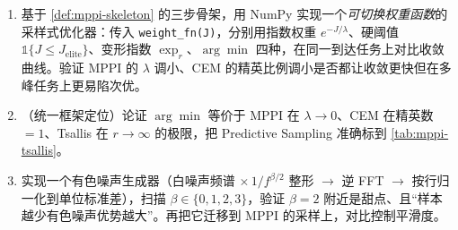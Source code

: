 \begin{practice}
\begin{enumerate}
  \item 基于 \cref{def:mppi-skeleton} 的三步骨架，用 NumPy 实现一个\emph{可切换权重函数}的采样式优化器：传入 \texttt{weight\_fn(J)}，分别用指数权重 $e^{-J/\lambda}$、硬阈值 $\mathbb{1}\{J\le J_{\mathrm{elite}}\}$、变形指数 $\exp_r$、$\arg\min$ 四种，在同一到达任务上对比收敛曲线。验证 MPPI 的 $\lambda$ 调小、CEM 的精英比例调小是否都让收敛更快但在多峰任务上更易陷次优。
  \item （统一框架定位）论证 $\arg\min$ 等价于 MPPI 在 $\lambda\to0$、CEM 在精英数 $=1$、Tsallis 在 $r\to\infty$ 的极限，把 Predictive Sampling 准确标到 \cref{tab:mppi-tsallis}。
  \item 实现一个有色噪声生成器（白噪声频谱 $\times\,1/f^{\beta/2}$ 整形 $\to$ 逆 FFT $\to$ 按行归一化到单位标准差），扫描 $\beta\in\{0,1,2,3\}$，验证 $\beta=2$ 附近是甜点、且“样本越少有色噪声优势越大”。再把它迁移到 MPPI 的采样上，对比控制平滑度。
\end{enumerate}
\end{practice}

